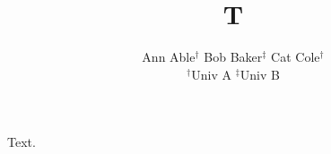 \documentclass{article}
\title{T}
\author{Ann Able$^{\dagger}$ \quad Bob Baker$^{\ddagger}$ \quad Cat Cole$^{\dagger}$ \\ $^{\dagger}$Univ A \qquad $^{\ddagger}$Univ B}
\begin{document}
\maketitle
Text.
\end{document}

